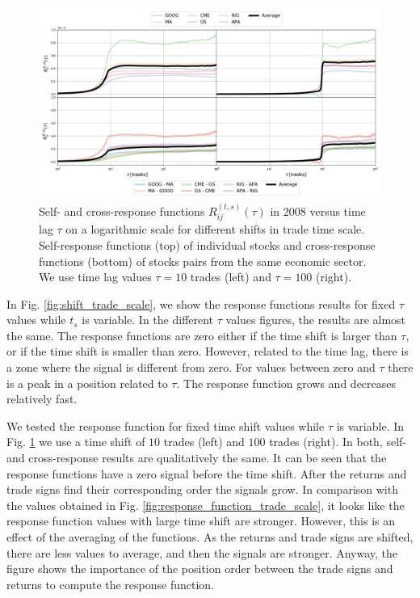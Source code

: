 \begin{figure}[htbp]
    \centering
    \includegraphics[width=\textwidth]{figures/04_shift_responses_trade.png}
    \caption{Self- and cross-response functions
             $R^{\left(t, s\right)}_{ij}\left(\tau\right)$ in 2008 versus time
             lag $\tau$ on a logarithmic scale for different shifts in trade
             time scale. Self-response functions (top) of individual stocks and
             cross-response functions (bottom) of stocks pairs from the same
             economic sector. We use time lag values $\tau=10$ trades (left)
             and $\tau=100$ (right).}
    \label{fig:shift_responses_trade_scale}
\end{figure}

In Fig. \ref{fig:shift_trade_scale}, we show the response functions results for
fixed $\tau$ values while $t_{s}$ is variable. In the different $\tau$ values
figures, the results are almost the same. The response functions are zero
either if the time shift is larger than $\tau$, or if the time shift is smaller
than zero. However, related to the time lag, there is a zone where the signal
is different from zero. For values between zero and $\tau$ there is a peak in a
position related to $\tau$. The response function grows and decreases
relatively fast.

We tested the response function for fixed time shift values while $\tau$ is
variable. In Fig. \ref{fig:shift_responses_trade_scale} we use a time shift of
$10$ trades (left) and $100$ trades (right). In both, self- and cross-response
results are qualitatively the same. It can be seen that the response functions
have a zero signal before the time shift. After the returns and trade signs
find their corresponding order the signals grow. In comparison with the values
obtained in Fig. \ref{fig:response_function_trade_scale}, it looks like the
response function values with large time shift are stronger. However, this is
an effect of the averaging of the functions. As the returns and trade signs are
shifted, there are less values to average, and then the signals are stronger.
Anyway, the figure shows the importance of the position order between the trade
signs and returns to compute the response function.

